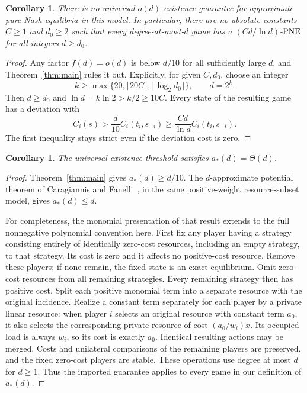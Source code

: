 \documentclass[11pt]{article}
\newtheorem{corollary}[theorem]{Corollary}
\theoremstyle{definition}
\theoremstyle{remark}
\newcommand{\PNE}{\textup{PNE}}
\begin{document}
\begin{corollary}\label{cor:sublinear}
There is no universal $o(d)$ existence guarantee for approximate pure Nash equilibria in this model. In particular, there are no absolute constants $C\ge1$ and $d_0\ge2$ such that every degree-at-most-$d$ game has a $(Cd/\ln d)$-$\PNE$ for all integers $d\ge d_0$.
\end{corollary}
\begin{proof}
Any factor $f(d)=o(d)$ is below $d/10$ for all sufficiently large $d$, and Theorem~\ref{thm:main} rules it out. Explicitly, for given $C,d_0$, choose an integer
\[
 k\ge\max\{20,\lceil20C\rceil,\lceil\log_2d_0\rceil\},
 \qquad d=2^k.
\]
Then $d\ge d_0$ and $\ln d=k\ln2>k/2\ge10C$. Every state of the resulting game has a deviation with
\[
 C_i(s)>\frac d{10}C_i(t_i,s_{-i})
 \ge\frac{Cd}{\ln d}C_i(t_i,s_{-i}).
\]
The first inequality stays strict even if the deviation cost is zero.
\end{proof}

\begin{corollary}\label{cor:order}
The universal existence threshold satisfies $a_*(d)=\Theta(d)$.
\end{corollary}
\begin{proof}
Theorem~\ref{thm:main} gives $a_*(d)\ge d/10$. The $d$-approximate potential theorem of Caragiannis and Fanelli~\cite[Theorem~2]{CF2021}, in the same positive-weight resource-subset model, gives $a_*(d)\le d$.

For completeness, the monomial presentation of that result extends to the full nonnegative polynomial convention here. First fix any player having a strategy consisting entirely of identically zero-cost resources, including an empty strategy, to that strategy. Its cost is zero and it affects no positive-cost resource. Remove these players; if none remain, the fixed state is an exact equilibrium. Omit zero-cost resources from all remaining strategies. Every remaining strategy then has positive cost. Split each positive monomial term into a separate resource with the original incidence. Realize a constant term separately for each player by a private linear resource: when player $i$ selects an original resource with constant term $a_0$, it also selects the corresponding private resource of cost $(a_0/w_i)x$. Its occupied load is always $w_i$, so its cost is exactly $a_0$. Identical resulting actions may be merged. Costs and unilateral comparisons of the remaining players are preserved, and the fixed zero-cost players are stable. These operations use degree at most $d$ for $d\ge1$. Thus the imported guarantee applies to every game in our definition of $a_*(d)$.
\end{proof}
\end{document}
